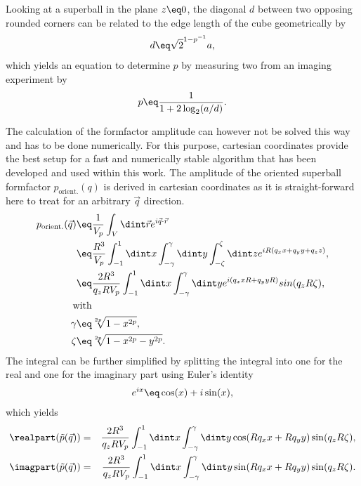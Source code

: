 \documentclass[\main/dresen_thesis.tex]{subfiles}
\begin{document}
    Looking at a superball in the plane $z \eq 0$, the diagonal $d$ between two opposing rounded corners can be related to the edge length of the cube geometrically by
    \begin{align}
      d \eq \sqrt{2}^{1-p^{-1}}a,
    \end{align}
    which yields an equation to determine $p$ by measuring two from an imaging experiment by
    \begin{align}
      p \eq \frac{1}{1 + 2\log_2(a/d)}.
    \end{align}

    The calculation of the formfactor amplitude can however not be solved this way and has to be done numerically.
    For this purpose, cartesian coordinates provide the best setup for a fast and numerically stable algorithm that has been developed and used within this work.
    The amplitude of the oriented superball formfactor $p_\mathrm{orient.}(q)$ is derived in cartesian coordinates as it is straight-forward here to treat for an arbitrary $\vec{q}$ direction.
    \begin{align}
      p_\mathrm{orient.}(\vec{q}) \eq& \frac{1}{V_p} \int_{V} \dint \vec{r} e^{i \vec{q} \cdot \vec{r}}\\
      \eq& \frac{R^3}{V_p} \int_{-1}^{1} \dint x \int_{-\gamma}^{\gamma} \dint y \int_{-\zeta}^{\zeta} \dint z  e^{iR(q_x x + q_y y + q_z z)},\\
      \eq& \frac{2R^3}{q_z R V_p} \int_{-1}^{1} \dint x \int_{-\gamma}^{\gamma} \dint y  e^{i (q_x x R + q_y y R)} sin(q_z R \zeta),\\
      \mathrm{with}\nonumber\\
      \gamma \eq& \sqrt[2p]{1-x^{2p}}, \\
      \zeta \eq& \sqrt[2p]{1-x^{2p} -y^{2p}}.
    \end{align}
    The integral can be further simplified by splitting the integral into one for the real and one for the imaginary part using Euler's identity
    \begin{align}
      e^{ix} \eq \cos(x) + i \sin(x),
    \end{align}
    which yields
    \begin{align}
      \realpart (\tilde{p}(\vec{q})) &=& \frac{2R^3}{q_z R V_p} \int_{-1}^{1} \dint x \int_{-\gamma}^{\gamma} \dint y \cos(R q_x x + R q_y y)  \sin (q_z R \zeta),\\
      \imagpart (\tilde{p}(\vec{q})) &=& \frac{2R^3}{q_z R V_p} \int_{-1}^{1} \dint x \int_{-\gamma}^{\gamma} \dint y \sin(R q_x x + R q_y y) \sin (q_z R \zeta).
    \end{align}
\end{document}

